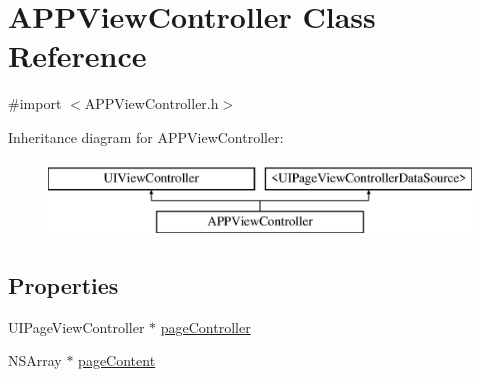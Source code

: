 \hypertarget{interface_a_p_p_view_controller}{\section{A\+P\+P\+View\+Controller Class Reference}
\label{interface_a_p_p_view_controller}
}


{\ttfamily \#import $<$A\+P\+P\+View\+Controller.\+h$>$}

Inheritance diagram for A\+P\+P\+View\+Controller\+:\begin{figure}[H]
\begin{center}
\leavevmode
\includegraphics[height=2.000000cm]{d3/ddb/interface_a_p_p_view_controller}
\end{center}
\end{figure}
\subsection*{Properties}
\begin{DoxyCompactItemize}
\item 
U\+I\+Page\+View\+Controller $\ast$ \hyperlink{interface_a_p_p_view_controller_a5ff97842eac6699ffb211f1ea2b93f3a}{page\+Controller}
\item 
N\+S\+Array $\ast$ \hyperlink{interface_a_p_p_view_controller_ae8a6de2bf7263546c8d7edb133392da6}{page\+Content}
\end{DoxyCompactItemize}



